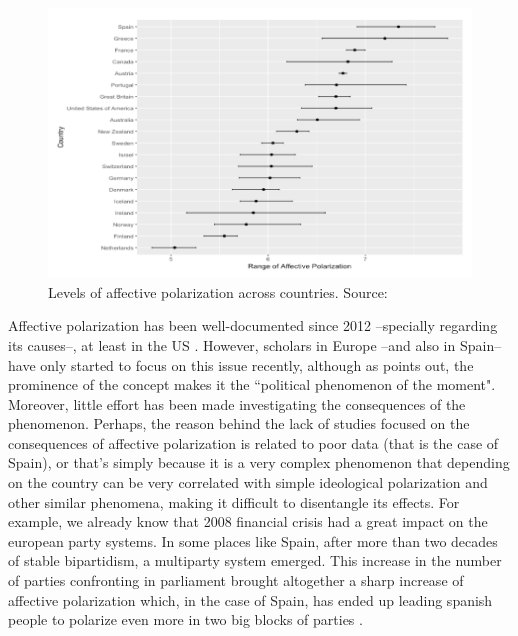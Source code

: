 \documentclass[a4paper, svgnames]{article}
\begin{document}
\begin{figure}
\centering
\includegraphics[scale=.7]{figure1.png}
\caption{\label{fig:af-pol-comp} Levels of affective polarization across countries. Source: \cite{Gidron2018}}
\end{figure}

Affective polarization has been well-documented since 2012 --specially regarding its causes--, at least in the US \citep{Hetherington2015,Rogowski2016, Webster2017,Lelkes2018,Iyengar2019, Klein2020}. However, scholars in Europe --and also in Spain-- have only started to focus on this issue recently, although as \cite{Miller2019} points out, the prominence of the concept makes it the ``political phenomenon of the moment". Moreover, little effort has been made investigating the consequences of the phenomenon. Perhaps, the reason behind the lack of studies focused on the consequences of affective polarization is related to poor data (that is the case of Spain), or that's simply because it is a very complex phenomenon that depending on the country can be very correlated with simple ideological polarization and other similar phenomena, making it difficult to disentangle its effects. For example, we already know that 2008 financial crisis had a great impact on the european party systems. In some places like Spain, after more than two decades of stable bipartidism, a multiparty system emerged. This increase in the number of parties confronting in parliament brought altogether a sharp increase of affective polarization which, in the case of Spain, has ended up leading spanish people to polarize even more in two big blocks of parties \citep{Orriols2020}.
\end{document}
